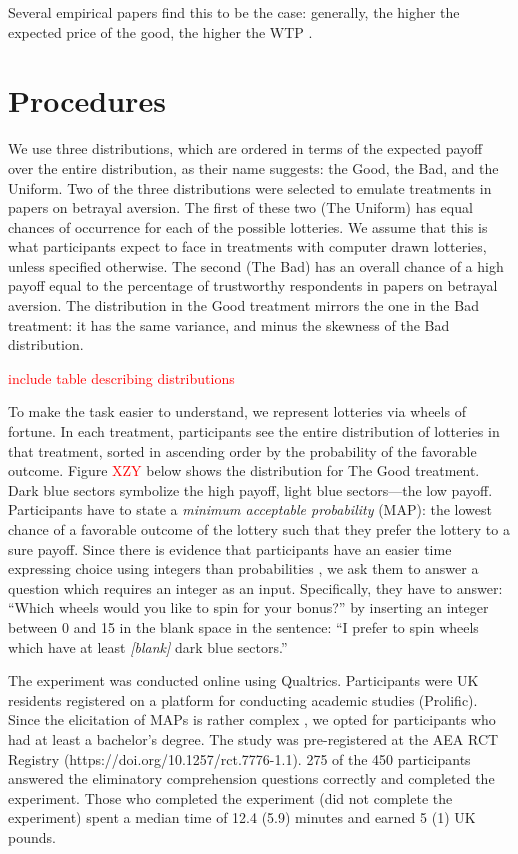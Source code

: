 Several empirical papers find this to be the case: generally, the higher the expected price of the good, the higher the WTP \citep[for a short review of this literature, see]{Tymula2016}.



\section{Procedures}\label{sec:proced}
We use three distributions, which are ordered in terms of the expected payoff over the entire distribution, as their name suggests: the Good, the Bad, and the Uniform.
Two of the three distributions were selected to emulate treatments in papers on betrayal aversion.
The first of these two (The Uniform) has equal chances of occurrence for each of the possible lotteries.
We assume that this is what participants expect to face in treatments with computer drawn lotteries, unless specified otherwise.
The second (The Bad) has an overall chance of a high payoff equal to the percentage of trustworthy respondents in papers on betrayal aversion.
The distribution in the Good treatment mirrors the one in the Bad treatment: it has the same variance, and minus the skewness of the Bad distribution.

\textcolor{red}{include table describing distributions}

To make the task easier to understand, we represent lotteries via wheels of fortune.
In each treatment, participants see the entire distribution of lotteries in that treatment, sorted in ascending order by the probability of the favorable outcome.
Figure \textcolor{red}{XZY} below shows the distribution for The Good treatment.
Dark blue sectors symbolize the high payoff, light blue sectors---the low payoff.
Participants have to state a \textit{minimum acceptable probability} (MAP): the lowest chance of a favorable outcome of the lottery such that they prefer the lottery to a sure payoff.
Since there is evidence that participants have an easier time expressing choice using integers than probabilities \citep{Quercia2016}, we ask them to answer a question which requires an integer as an input.
Specifically, they have to answer: ``Which wheels would you like to spin for your bonus?'' by inserting an integer between 0 and 15 in the blank space in the sentence: ``I prefer to spin wheels which have at least \textit{[blank]} dark blue sectors.''

The experiment was conducted online using Qualtrics.
Participants were UK residents registered on a platform for conducting academic studies (Prolific).
Since the elicitation of MAPs is rather complex \citep{Quercia2016,Polipciuc2020}, we opted for participants who had at least a bachelor's degree.
The study was pre-registered at the AEA RCT Registry (https://doi.org/10.1257/rct.7776-1.1).
275 of the 450 participants answered the eliminatory comprehension questions correctly and completed the experiment.
Those who completed the experiment (did not complete the experiment) spent a median time of 12.4 (5.9) minutes and earned 5 (1) UK pounds.




